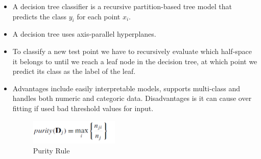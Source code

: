 \begin{itemize}
    \item A decision tree classifier is a recursive partition-based tree model that predicts the class $y_i$ for each point $x_i$.
    \item A decision tree uses axis-parallel hyperplanes.
    \item To classify a new test point we have to recursively evaluate which half-space it belongs to until we reach a leaf node in the decision tree, at which point we predict its class as the label of the leaf.
    \item Advantages include easily interpretable models, supports multi-class and handles both numeric and categoric data. Disadvantages is it can cause over fitting if used bad threshold values for input.
\begin{figure}[H]
\centerline{\includegraphics[width=0.4\textwidth]{Figures/dt1}}
\caption{\label{fig:figure}Purity Rule}
\end{figure}

\end{itemize}
